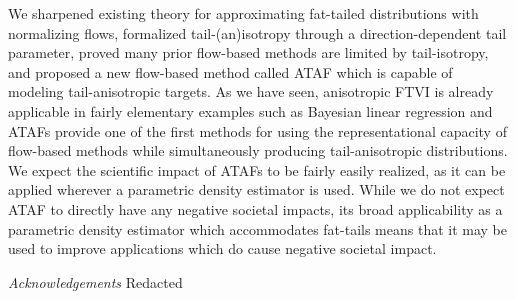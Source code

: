 \documentclass[twoside]{article}
\theoremstyle{definition}
\theoremstyle{remark}
\begin{document}
We sharpened existing theory for approximating fat-tailed distributions with normalizing flows, formalized  tail-(an)isotropy through a direction-dependent tail parameter, proved many prior flow-based methods are limited by tail-isotropy, and proposed a new flow-based method called
ATAF which is capable of modeling tail-anisotropic targets.
As we have seen, anisotropic FTVI is already applicable in fairly elementary examples such as Bayesian linear regression
and ATAFs provide one of the first methods for using the representational capacity of flow-based methods
while simultaneously producing tail-anisotropic distributions. We expect the scientific impact of ATAFs to be
fairly easily realized, as it can be applied wherever a parametric density estimator is used.
While we do not expect ATAF to directly have any negative societal impacts,
its broad applicability as a parametric density estimator which accommodates fat-tails means that it may be
used to improve applications which do cause negative societal impact.


\emph{Acknowledgements}
Redacted





\end{document}
